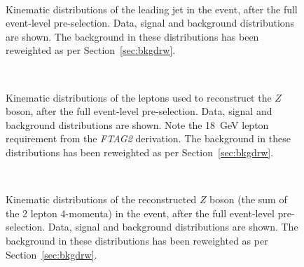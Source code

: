 \documentclass[NOTE, atlasdraft=true, texlive=2017, UKenglish]{\ATLASLATEXPATH atlasdoc}
\begin{document}
\begin{figure}[!htbp]
  \centering
  \\
  \caption{Kinematic distributions of the leading jet in the event, after the full event-level pre-selection. Data, signal and background distributions are shown. The background in these distributions has been reweighted as per Section~\ref{sec:bkgdrw}.}
  \label{fig:calojetkinematics}
\end{figure}

\begin{figure}[!htbp]
  \centering
  \\
  \caption{Kinematic distributions of the leptons used to reconstruct the $Z$ boson, after the full event-level pre-selection. Data, signal and background distributions are shown. Note the 18~GeV lepton requirement from the \emph{FTAG2} derivation. The background in these distributions has been reweighted as per Section~\ref{sec:bkgdrw}.}
  \label{fig:leptonkinematics}
\end{figure}

\begin{figure}[!htbp]
  \centering
  \\
  \caption{Kinematic distributions of the reconstructed $Z$ boson (the sum of the 2 lepton 4-momenta) in the event, after the full event-level pre-selection. Data, signal and background distributions are shown. The background in these distributions has been reweighted as per Section~\ref{sec:bkgdrw}.}
  \label{fig:zkinematics}
\end{figure}
\end{document}
